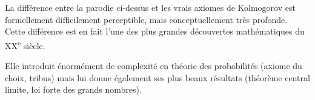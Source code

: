 \documentclass[main.tex]{subfiles}
\begin{document}
\begin{remark}

    La différence entre la parodie ci-dessus et les vrais axiomes de Kolmogorov est formellement difficilement perceptible,
    mais conceptuellement très profonde.
    Cette différence est en fait l'une des plus grandes découvertes mathématiques du XX\textsuperscript{e} siècle.

    Elle introduit énormément de complexité en théorie des probabilités
    (axiome du choix, tribus)
    mais lui donne également ses plus beaux résultats
    (théorème central limite, loi forte des grands nombres).
\end{remark}
\end{document}
